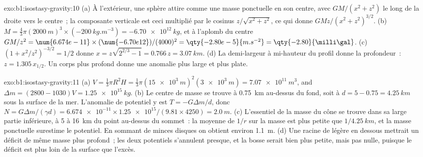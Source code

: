\begin{solution}{exo:b1:isostasy-gravity:10}
(a) À l'extérieur, une sphère attire comme une masse ponctuelle en son centre, avec
$GM/(x^2 + z^2)$ le long de la droite vers le centre~; la composante verticale est ceci
multiplié par le cosinus $z/\sqrt{x^2 + z^2}$, ce qui donne $GMz/(x^2 + z^2)^{3/2}$.
(b) $M = \tfrac43\pi(\qty{2000}{m})^3\times(\qty{-200}{kg.m^{-3}}) =
\qty{-6.70e12}{kg}$, et à l'aplomb du centre $GM/z^2 = \num{6.674e-11}\times
(\num{-6.70e12})/(4000)^2 = \qty{-2.80e-5}{m.s^{-2}} = \qty{-2.80}{\milli\gal}$.
(c) $(1 + x^2/z^2)^{-3/2} = 1/2$ donne $x = z\sqrt{2^{2/3} - 1} = 0.766\,z =
\qty{3.07}{km}$. (d) La demi-largeur à mi-hauteur du profil donne la
profondeur~: $z = 1.305\,x_{1/2}$. Un corps plus profond donne une anomalie plus large et plus plate.
\end{solution}

\begin{solution}{exo:b1:isostasy-gravity:11}
(a) $V = \tfrac13\pi R^2 H = \tfrac13\pi(\qty{15e3}{m})^2(\qty{3e3}{m}) =
\qty{7.07e11}{m^3}$, and $\Delta m = (2800 - 1030)V = \qty{1.25e15}{kg}$.
(b) Le centre de masse se trouve à \qty{0.75}{km} au-dessus du fond, soit à
$d = 5 - 0.75 = \qty{4.25}{km}$ sous la surface de la mer. L'anomalie de potentiel
y est $T = -G\Delta m/d$, donc $N = G\Delta m/(\gamma d) =
\num{6.674e-11}\times\num{1.25e15}/(9.81\times4250) = \qty{2.0}{m}$.
(c) L'essentiel de la masse du cône se trouve dans sa large partie inférieure, à 5 à
\qty{16}{km} du point au-dessus du sommet~: la moyenne de $1/r$ sur la masse
est plus petite que $1/\qty{4.25}{km}$, et la masse ponctuelle surestime le
potentiel. En sommant de minces disques on obtient environ \qty{1.1}{m}.
(d) Une racine de  légère en dessous mettrait un déficit de même masse plus
profond~; les deux potentiels s'annulent presque, et la bosse serait bien plus petite,
mais pas nulle, puisque le déficit est plus loin de la surface que l'excès.
\end{solution}


